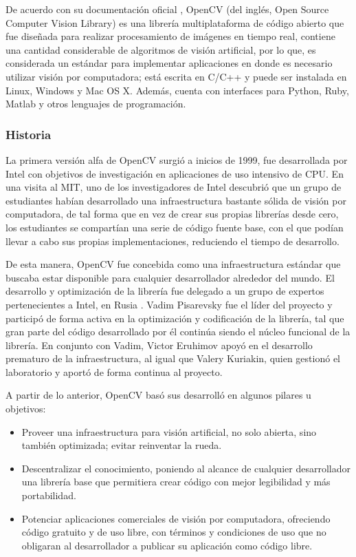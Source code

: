 De acuerdo con su documentación oficial \cite{OpenCV}, OpenCV (del inglés, Open Source Computer Vision Library) es una librería multiplataforma de código abierto que fue diseñada para realizar procesamiento de imágenes en tiempo real, contiene una cantidad considerable de algoritmos de visión artificial, por lo que, es considerada un estándar para implementar aplicaciones en donde es necesario utilizar visión por computadora; está escrita en C/C++ y puede ser instalada en Linux, Windows y Mac OS X. Además, cuenta con interfaces para Python, Ruby, Matlab y otros lenguajes de programación. 

\subsubsection{Historia}
La primera versión alfa de OpenCV surgió a inicios de 1999, fue desarrollada por Intel con objetivos de investigación en aplicaciones de uso intensivo de CPU. En una visita al MIT, uno de los investigadores de Intel descubrió que un grupo de estudiantes habían desarrollado una infraestructura bastante sólida de visión por computadora, de tal forma que en vez de crear sus propias librerías desde cero, los estudiantes se compartían una serie de código fuente base, con el que podían llevar a cabo sus propias implementaciones, reduciendo el tiempo de desarrollo. 

De esta manera, OpenCV fue concebida como una infraestructura estándar que buscaba estar disponible para cualquier desarrollador alrededor del mundo. El desarrollo y optimización de la librería fue delegado a un grupo de expertos pertenecientes a Intel, en Rusia \cite{bradski2008learning}. Vadim Pisarevsky fue el líder del proyecto y participó de forma activa en la optimización y codificación de la librería, tal que gran parte del código desarrollado por él continúa siendo el núcleo funcional de la librería. En conjunto con Vadim, Victor Eruhimov apoyó en el desarrollo prematuro de la infraestructura, al igual que Valery Kuriakin, quien gestionó el laboratorio y aportó de forma continua al proyecto. 

A partir de lo anterior, OpenCV basó sus desarrolló en algunos pilares u objetivos:

\begin{itemize}
    \item Proveer una infraestructura para visión artificial, no solo abierta, sino también optimizada; evitar reinventar la rueda.
    \item Descentralizar el conocimiento, poniendo al alcance de cualquier desarrollador una librería base que permitiera crear código con mejor legibilidad y más portabilidad.
    \item Potenciar aplicaciones comerciales de visión por computadora, ofreciendo código gratuito y de uso libre, con términos y condiciones de uso que no obligaran al desarrollador a publicar su aplicación como código libre.
\end{itemize}

